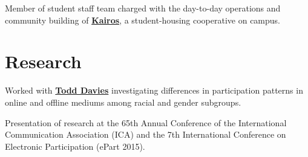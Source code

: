 \documentclass[letterpaper]{deedy-resume} %
\begin{document}
\begin{minipage}[t]{0.66\textwidth}


\begin{tightitemize}
\item Member of student staff team charged with the day-to-day operations and community building of \textbf{\href{http://web.stanford.edu/group/kairos/}{Kairos}}, a student-housing cooperative on campus. 


\end{tightitemize}

\sectionspace %






\section{Research}


\begin{tightitemize}
\item Worked with \textbf{\href{http://www.web.stanford.edu/~davies/}{Todd Davies}} investigating differences in participation patterns in online and offline mediums among racial and gender subgroups. 
\item Presentation of research at the 65th Annual Conference of the International Communication Association (ICA) and the 7th International Conference on Electronic Participation (ePart 2015).
\end{tightitemize}


\end{minipage}
\end{document}
